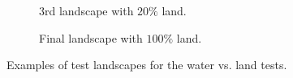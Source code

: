 \begin{figure}
  \begin{subfigure}[b]{0.5\linewidth}
    \centering
    \caption{3rd landscape with $20\%$ land.} 
    \label{fig:20landscape} 
  \end{subfigure}%
  \begin{subfigure}[b]{0.5\linewidth}
    \centering
    \caption{Final landscape with $100\%$ land.} 
    \label{fig:100landscape} 
  \end{subfigure} 
  \caption{Examples of test landscapes for the water vs. land tests.}
  \label{fig:watervslandlandscape} 
\end{figure}


